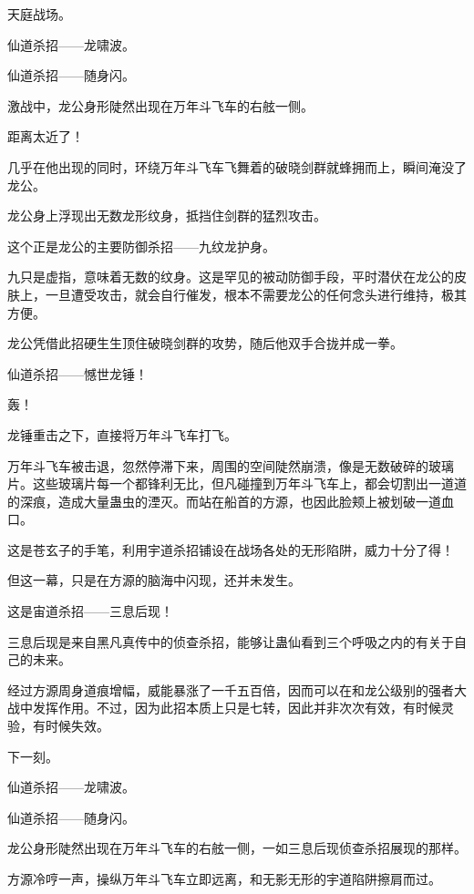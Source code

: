 
\begin{this_body}



天庭战场。

仙道杀招——龙啸波。

仙道杀招——随身闪。

激战中，龙公身形陡然出现在万年斗飞车的右舷一侧。

距离太近了！

几乎在他出现的同时，环绕万年斗飞车飞舞着的破晓剑群就蜂拥而上，瞬间淹没了龙公。

龙公身上浮现出无数龙形纹身，抵挡住剑群的猛烈攻击。

这个正是龙公的主要防御杀招——九纹龙护身。

九只是虚指，意味着无数的纹身。这是罕见的被动防御手段，平时潜伏在龙公的皮肤上，一旦遭受攻击，就会自行催发，根本不需要龙公的任何念头进行维持，极其方便。

龙公凭借此招硬生生顶住破晓剑群的攻势，随后他双手合拢并成一拳。

仙道杀招——憾世龙锤！

轰！

龙锤重击之下，直接将万年斗飞车打飞。

万年斗飞车被击退，忽然停滞下来，周围的空间陡然崩溃，像是无数破碎的玻璃片。这些玻璃片每一个都锋利无比，但凡碰撞到万年斗飞车上，都会切割出一道道的深痕，造成大量蛊虫的湮灭。而站在船首的方源，也因此脸颊上被划破一道血口。

这是苍玄子的手笔，利用宇道杀招铺设在战场各处的无形陷阱，威力十分了得！

但这一幕，只是在方源的脑海中闪现，还并未发生。

这是宙道杀招——三息后现！

三息后现是来自黑凡真传中的侦查杀招，能够让蛊仙看到三个呼吸之内的有关于自己的未来。

经过方源周身道痕增幅，威能暴涨了一千五百倍，因而可以在和龙公级别的强者大战中发挥作用。不过，因为此招本质上只是七转，因此并非次次有效，有时候灵验，有时候失效。

下一刻。

仙道杀招——龙啸波。

仙道杀招——随身闪。

龙公身形陡然出现在万年斗飞车的右舷一侧，一如三息后现侦查杀招展现的那样。

方源冷哼一声，操纵万年斗飞车立即远离，和无影无形的宇道陷阱擦肩而过。


\end{this_body}
